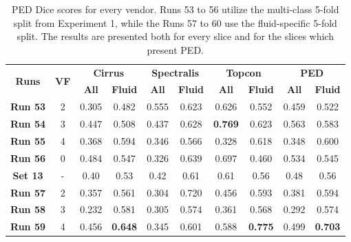\begin{table}[!ht]
	\caption{PED Dice scores for every vendor. Runs 53 to 56 utilize the multi-class 5-fold split from Experiment 1, while the Runs 57 to 60 use the fluid-specific 5-fold split. The results are presented both for every slice and for the slices which present PED.}
	\centering
	\begin{tabular}{|c|c|cc|cc|cc|cc|}
		\hline
		\multirow{2}{*}{\textbf{Runs}} &
		\multirow{2}{*}{\textbf{VF}} & 
		\multicolumn{2}{c|}{\textbf{Cirrus}} & 
		\multicolumn{2}{c|}{\textbf{Spectralis}} & 
		\multicolumn{2}{c|}{\textbf{Topcon}} & 
		\multicolumn{2}{c|}{\textbf{PED}} \\ 
		\cline{3-10} & &
		\multicolumn{1}{c}{\textbf{All}} &  
		\textbf{\textbf{Fluid}} & 
		\multicolumn{1}{c}{\textbf{All}} &  
		\textbf{\textbf{Fluid}} & 
		\multicolumn{1}{c}{\textbf{All}} & 
		\textbf{\textbf{Fluid}} & 
		\multicolumn{1}{c}{\textbf{All}} & 
		\textbf{\textbf{Fluid}}\\ 
		
		\hline
		
		\textbf{Run 53} & 2 & 0.305 & 0.482 & 0.555 & 0.623 & 0.626 & 0.552 & 0.459 & 0.522 \\
		
		\textbf{Run 54} & 3 & 0.447 & 0.508 & 0.437 & 0.628 & \textbf{0.769} & 0.623 & 0.563 & 0.583 \\
		
		\textbf{Run 55} & 4 & 0.368 & 0.594 & 0.346 & 0.566 & 0.328 & 0.618 & 0.348 & 0.600 \\
		
		\textbf{Run 56} & 0 & 0.484 & 0.547 & 0.326 & 0.639 & 0.697 & 0.460 & 0.534 & 0.545 \\
		
		\hline
		
		\textbf{Set 13} & - & 0.40 & 0.53 & 0.42 & 0.61 & 0.61 & 0.56 & 0.48 & 0.56 \\
		
		\hline
		\hline
		
		\textbf{Run 57} & 2 & 0.357 & 0.561 & 0.304 & 0.720 & 0.456 & 0.593 & 0.381 & 0.594 \\
		
		\textbf{Run 58} & 3 & 0.232 & 0.581 & 0.305 & 0.574 & 0.361 & 0.568 & 0.292 & 0.574 \\
		
		\textbf{Run 59} & 4 & 0.456 & \textbf{0.648} & 0.345 & 0.601 & 0.588 & \textbf{0.775} & 0.499 & \textbf{0.703} \\
		

\end{tabular}
\end{table}
